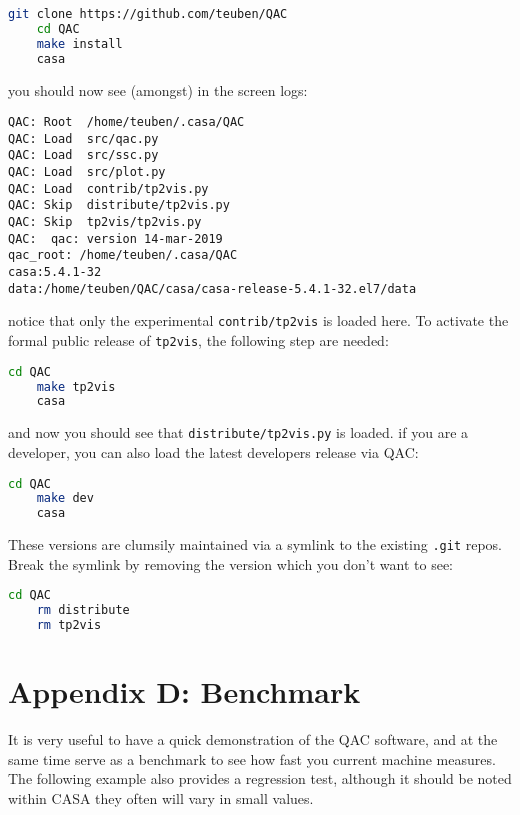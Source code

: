\documentclass[12pt,a4paper]{article}
\begin{document}
\begin{lstlisting}[language=bash]
    git clone https://github.com/teuben/QAC
    cd QAC
    make install
    casa
\end{lstlisting}

\noindent
you should now see (amongst) in the screen logs:

\footnotesize
\begin{verbatim}
QAC: Root  /home/teuben/.casa/QAC
QAC: Load  src/qac.py
QAC: Load  src/ssc.py
QAC: Load  src/plot.py
QAC: Load  contrib/tp2vis.py
QAC: Skip  distribute/tp2vis.py
QAC: Skip  tp2vis/tp2vis.py
QAC:  qac: version 14-mar-2019
qac_root: /home/teuben/.casa/QAC
casa:5.4.1-32
data:/home/teuben/QAC/casa/casa-release-5.4.1-32.el7/data
\end{verbatim}
\normalsize

notice that only the experimental {\tt contrib/tp2vis} is loaded here. To
activate the formal public release of {\tt tp2vis}, the following
step are needed:

\begin{lstlisting}[language=bash]
    cd QAC
    make tp2vis
    casa
\end{lstlisting}

and now you should see that {\tt distribute/tp2vis.py} is loaded.   if you are a developer, you can also
load the latest developers release via QAC:

\begin{lstlisting}[language=bash]
    cd QAC
    make dev
    casa
\end{lstlisting}

These versions are clumsily maintained via a symlink to the existing {\tt .git} repos. Break the symlink
by removing the version which you don't want to see:

\begin{lstlisting}[language=bash]
    cd QAC
    rm distribute
    rm tp2vis
\end{lstlisting}



\newpage
\section*{Appendix D: Benchmark}

It is very useful to have a quick demonstration of the QAC software, and at the same time
serve as a benchmark to see how fast you current machine measures. The following example
also provides a regression test, although it should be noted within CASA they often will
vary in small values.
\end{document}
